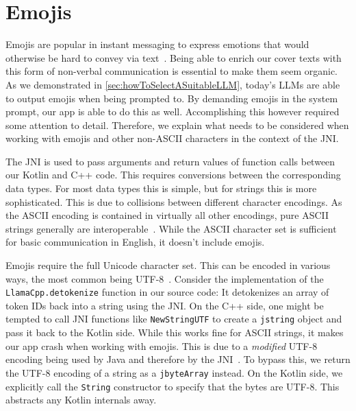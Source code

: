 \section{Emojis}
\label{sec:emojis}
Emojis are popular in instant messaging to express emotions that would otherwise be hard to convey via text~\cite{zhouGoodbyeTextHello2017}. Being able to enrich our cover texts with this form of non-verbal communication is essential to make them seem organic. As we demonstrated in \cref{sec:howToSelectASuitableLLM}, today's \glspl{LLM} are able to output emojis when being prompted to. By demanding emojis in the system prompt, our app is able to do this as well. Accomplishing this however required some attention to detail. Therefore, we explain what needs to be considered when working with emojis and other non-ASCII characters in the context of the \gls{JNI}.

The \gls{JNI} is used to pass arguments and return values of function calls between our Kotlin and C++ code. This requires conversions between the corresponding data types. For most data types this is simple, but for strings this is more sophisticated. This is due to collisions between different character encodings. As the ASCII encoding is contained in virtually all other encodings, pure ASCII strings generally are interoperable~\cite{gleaveMakingCompressionAlgorithms2017}. While the ASCII character set is sufficient for basic communication in English, it doesn't include emojis.

Emojis require the full Unicode character set. This can be encoded in various ways, the most common being UTF-8~\cite{gleaveMakingCompressionAlgorithms2017}. Consider the implementation of the \lstinline|LlamaCpp.detokenize| function in our source code: It detokenizes an array of token IDs back into a string using the \gls{JNI}. On the C++ side, one might be tempted to call \gls{JNI} functions like \lstinline|NewStringUTF| to create a \lstinline|jstring| object and pass it back to the Kotlin side. While this works fine for ASCII strings, it makes our app crash when working with emojis. This is due to a \textit{modified} UTF-8 encoding being used by Java and therefore by the \gls{JNI}~\cite{oracleJNIFunctions}. To bypass this, we return the UTF-8 encoding of a string as a \lstinline|jbyteArray| instead. On the Kotlin side, we explicitly call the \lstinline|String| constructor to specify that the bytes are UTF-8. This abstracts any Kotlin internals away.

